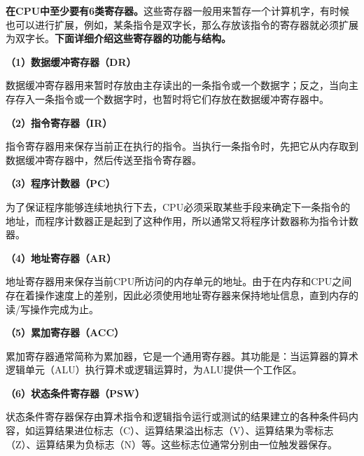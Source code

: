 {\textbf{在CPU中至少要有6类寄存器。}}这些寄存器一般用来暂存一个计算机字，有时候也可以进行扩展，例如，某条指令是双字长，那么存放该指令的寄存器就必须扩展为双字长。\textbf{下面详细介绍这些寄存器的功能与结构。}

\textbf{（1）数据缓冲寄存器（DR）}

数据缓冲寄存器用来暂时存放由主存读出的一条指令或一个数据字；反之，当向主存存入一条指令或一个数据字时，也暂时将它们存放在数据缓冲寄存器中。

\textbf{（2）指令寄存器（IR）}

指令寄存器用来保存当前正在执行的指令。当执行一条指令时，先把它从内存取到数据缓冲寄存器中，然后传送至指令寄存器。

\textbf{（3）程序计数器（PC）}

为了保证程序能够连续地执行下去，CPU必须采取某些手段来确定下一条指令的地址，而程序计数器正是起到了这种作用，所以通常又将程序计数器称为指令计数器。

\textbf{（4）地址寄存器（AR）}

地址寄存器用来保存当前CPU所访问的内存单元的地址。由于在内存和CPU之间存在着操作速度上的差别，因此必须使用地址寄存器来保持地址信息，直到内存的读/写操作完成为止。

\textbf{（5）累加寄存器（ACC）}

累加寄存器通常简称为累加器，它是一个通用寄存器。其功能是：当运算器的算术逻辑单元（ALU）执行算术或逻辑运算时，为ALU提供一个工作区。

\textbf{（6）状态条件寄存器（PSW）}

状态条件寄存器保存由算术指令和逻辑指令运行或测试的结果建立的各种条件码内容，如运算结果进位标志（C）、运算结果溢出标志（V）、运算结果为零标志（Z）、运算结果为负标志（N）等。这些标志位通常分别由一位触发器保存。

